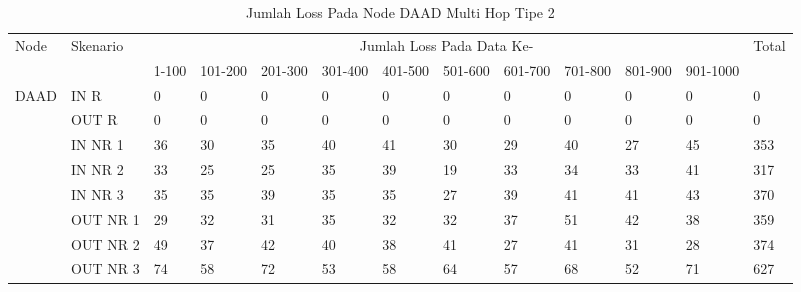 \begin{table}[H]
  \centering
  \caption{Jumlah Loss Pada Node DAAD Multi Hop Tipe 2}
    \begin{tabular}{|p{1cm}|p{1.9cm}|p{0.6cm}|p{0.6cm}|p{0.6cm}|p{0.6cm}|p{0.6cm}|p{0.6cm}|p{0.6cm}|p{0.6cm}|p{0.6cm}|p{0.6cm}|p{1cm}|}
    \hline
        \multirow{2}{*}{Node}&\multirow{2}{*}{Skenario}&\multicolumn{10}{|c|}{Jumlah Loss Pada Data Ke-}&\multirow{2}{*}{Total} \\\cline{3-12}
          & & 1-100 & 101-200 & 201-300 & 301-400 & 401-500 & 501-600 & 601-700 & 701-800 & 801-900 & 901-1000 & \\
        \hline
    \multirow{8}{*}{DAAD}  
    & IN R  & 0     & 0     & 0     & 0     & 0     & 0     & 0     & 0     & 0     & 0     & 0 \\
          & OUT R & 0     & 0     & 0     & 0     & 0     & 0     & 0     & 0     & 0     & 0     & 0 \\
          & IN NR 1 & 36    & 30    & 35    & 40    & 41    & 30    & 29    & 40    & 27    & 45    & 353 \\
          & IN NR 2 & 33    & 25    & 25    & 35    & 39    & 19    & 33    & 34    & 33    & 41    & 317 \\
          & IN NR 3 & 35    & 35    & 39    & 35    & 35    & 27    & 39    & 41    & 41    & 43    & 370 \\
          & OUT NR 1 & 29    & 32    & 31    & 35    & 32    & 32    & 37    & 51    & 42    & 38    & 359 \\
          & OUT NR 2 & 49    & 37    & 42    & 40    & 38    & 41    & 27    & 41    & 31    & 28    & 374 \\
          & OUT NR 3 & 74    & 58    & 72    & 53    & 58    & 64    & 57    & 68    & 52    & 71    & 627 \\
        \hline
    \end{tabular}%
  \label{tab:addlabel}%
\end{table}%
